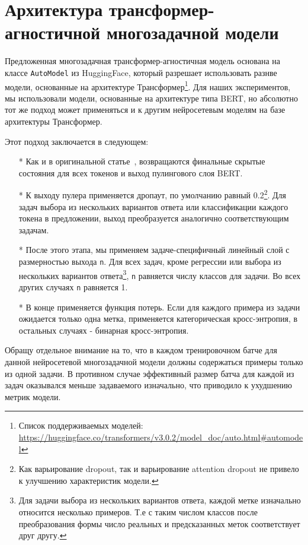 \section{Архитектура трансформер-агностичной многозадачной модели}\label{ch:tr-ag:architecture} 
Предложенная многозадачная трансформер-агностичная модель основана на классе \texttt{AutoModel} из HuggingFace, который разрешает использовать разнве модели, основанные на архитектуре Трансформер\footnote{Список поддерживаемых моделей: \url{https://huggingface.co/transformers/v3.0.2/model_doc/auto.html\#automodel}}. Для наших экспериментов, мы использовали модели, основанные на архитектуре типа BERT, но абсолютно тот же подход может применяться и к другим нейросетевым моделям на базе архитектуры Трансформер. 

Этот подход заключается в следующем:
\begin{itemize}

    \item[*] Как и в оригинальной статье~\cite{bert}, возвращаются финальные скрытые состояния для всех токенов и выход пулингового слоя BERT. 

    \item[*] К выходу пулера применяется дропаут, по умолчанию равный 0.2\footnote{Как варьирование dropout, так и варьирование attention dropout не привело к улучшению характеристик модели.}. Для задач выбора из нескольких вариантов ответа или классификации каждого токена в предложении, выход преобразуется аналогично соответствующим задачам. 

    \item[*]После этого этапа, мы применяем задаче-специфичный линейный слой с размерностью выхода \texttt{n}. Для всех задач, кроме регрессии или выбора из нескольких вариантов ответа\footnote{Для задачи выбора из нескольких вариантов ответа, каждой метке изначально относится несколько примеров. Т.е с таким числом классов после преобразования формы число реальных и предсказанных меток соответствует друг другу.}, \texttt{n} равняется числу классов для задачи. Во всех других случаях \texttt{n} равняется 1.
 
    \item[*]В конце применяется функция потерь. Если для каждого примера из задачи ожидается только одна метка, применяется категорическая кросс-энтропия, в остальных случаях - бинарная кросс-энтропия. 

\end{itemize}

Обращу отдельное внимание на то, что в каждом тренировочном батче для данной нейросетевой многозадачной модели должны содержаться примеры только из одной задачи. В противном случае эффективный размер батча для каждой из задач оказывался меньше задаваемого изначально, что приводило к ухудшению метрик модели. 

